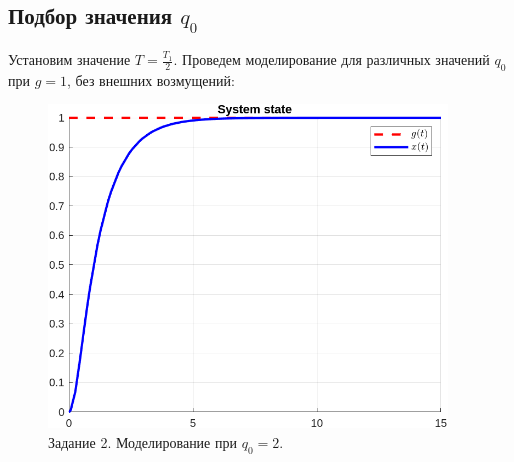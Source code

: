 \documentclass[a4paper, 14pt]{extarticle}
\theoremstyle{definition}
\theoremstyle{plain}
\theoremstyle{remark}
\begin{document}
\subsection{Подбор значения $q_0$}
Установим значение $T = \frac{T_1}{2}$. Проведем моделирование для различных значений $q_0$ при $g=1$, без внешних возмущений:
\begin{figure}
    [H]
    \centering
    \includegraphics[width=300pt]{images/task2__q0_2_state.png}
    \caption{Задание 2. Моделирование при $q_0 = 2$.}
    \label{fig:task2__q0_2_state}
\end{figure}
\end{document}
